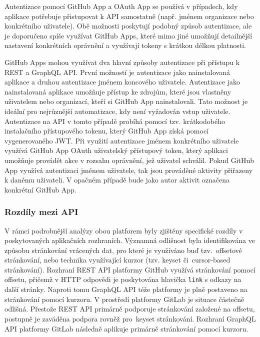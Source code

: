 Autentizace pomocí GitHub App a OAuth App se používá v případech, kdy aplikace potřebuje přistupovat k API samostatně (např. jménem organizace nebo konkrétního uživatele). Obě možnosti poskytují podobný způsob autentizace, ale je doporučeno spíše využívat GitHub Apps, které mimo jiné umožňují detailnější nastavení konkrétních oprávnění a využívají tokeny s krátkou délkou platnosti. \cite{GitHub-REST-auth, GitHub-auth, GitHub-oauth-apps}

GitHub Apps mohou využívat dva hlavní způsoby autentizace při přístupu k REST a GraphQL API. První možností je autentizace jako nainstalovaná aplikace a druhou autentizace jménem koncového uživatele. Autentizace jako nainstalovaná aplikace umožňuje přístup ke zdrojům, které jsou vlastněny uživatelem nebo organizací, kteří si GitHub App nainstalovali. Tato možnost je ideální pro nejrůznější automatizace, kdy není vyžadován vstup uživatele. Autentizace na API v tomto případě probíhá pomocí tzv. krátkodobého instalačního přístupového tokenu, který GitHub App získá pomocí vygenerovaného JWT. Při využití autentizace jménem konkrétního uživatele využívá GitHub App OAuth uživatelský přístupový token, který aplikaci umožňuje provádět akce v rozsahu oprávnění, jež uživatel schválil. Pokud GitHub App využívá autentizaci jménem uživatele, tak jsou prováděné aktivity přiřazeny k danému uživateli. V opačném případě bude jako autor aktivit označena konkrétní GitHub App. \cite{GitHub-GitHub-app}

\subsubsection{Rozdíly mezi API}
V rámci podrobnější analýzy obou platforem byly zjištěny specifické rozdíly v poskytovaných aplikačních rozhraních. Významná odlišnost byla identifikována ve způsobu stránkování vrácených dat, pro které je využíváno buď tzv.~offsetové stránkování, nebo technika využívající kurzor (tzv. keyset či~cursor-based stránkování). Rozhraní REST API platformy GitHub využívá stránkování pomocí offsetu, přičemž v HTTP odpovědi je poskytována hlavička \texttt{link} s odkazy na další stránky. \cite{GitHub-REST-pagination} Naproti tomu GraphQL API téže platformy je plně postaveno na stránkování pomocí kurzoru. \cite{GitHub-GraphQL-pagination} V prostředí platformy GitLab je situace částečně odlišná. Přestože REST API primárně podporuje stránkování založené na offsetu, postupně je zaváděna podpora rovněž pro~keyset stránkování. \cite{GitLab-REST-pagination} Rozhraní GraphQL API platformy GitLab následně aplikuje primárně stránkování pomocí kurzoru. \cite{GitLab-GraphQL-pagination}

